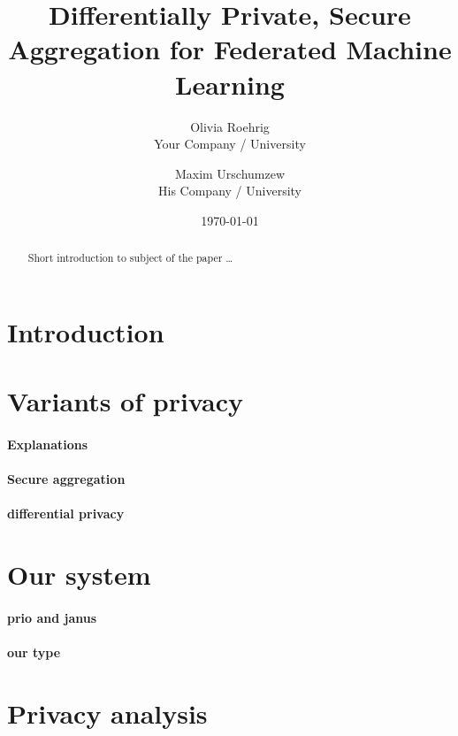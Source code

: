 \documentclass{article}
\title{Differentially Private, Secure Aggregation for Federated Machine Learning}
\author{Olivia Roehrig  \\
	Your Company / University  \\
	\and
	Maxim Urschumzew \\
	His Company / University \\
	}
\date{\today}
\begin{document}
\maketitle


\begin{abstract}
Short introduction to subject of the paper \ldots 
\end{abstract}

\section{Introduction}

\section{Variants of privacy}

\paragraph{Explanations}

\paragraph{Secure aggregation}

\paragraph{differential privacy}

\section{Our system}

\paragraph{prio and janus}

\paragraph{our type}

\section{Privacy analysis}

\end{document}
